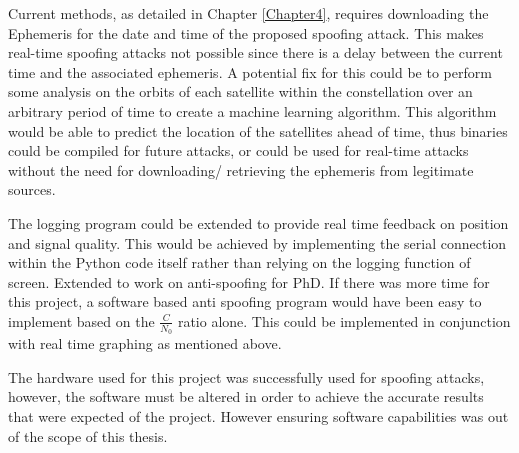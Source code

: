 Current methods, as detailed in Chapter \ref{Chapter4}, requires downloading the Ephemeris for the date and time of the proposed spoofing attack. This makes real-time spoofing
attacks not possible since there is a delay between the current time and the associated ephemeris. A potential fix for this could be to perform some analysis on the
orbits of each satellite within the constellation over an arbitrary period of time to create a machine learning algorithm. This algorithm would be able to predict the
location of the satellites ahead of time, thus binaries could be compiled for future attacks, or could be used for real-time attacks without the need for downloading/
retrieving the ephemeris from legitimate sources.

The logging program could be extended to provide real time feedback on position and signal quality. This would be achieved by implementing the serial connection within
the Python code itself rather than relying on the logging function of screen.
Extended to work on anti-spoofing for PhD. If there was more time for this project, a software based anti spoofing program would have been easy to implement based
on the $\frac{C}{N_0}$ ratio alone. This could be implemented in conjunction with real time graphing as mentioned above.

The hardware used for this project was successfully used for spoofing attacks, however, the software must be altered in order to achieve the accurate results that were
expected of the project. However ensuring software capabilities was out of the scope of this thesis.